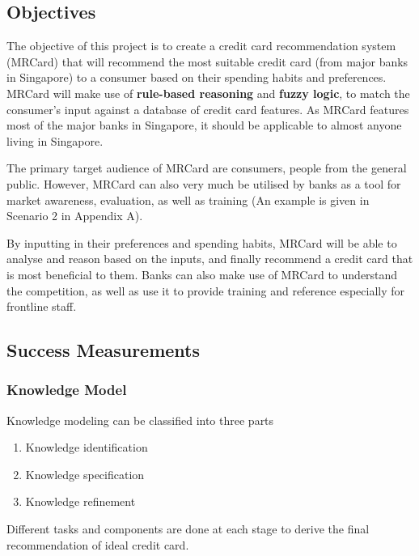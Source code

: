 \subsection{Objectives} %
\label{sub:objectives}
	The objective of this project is to create a credit card recommendation system (MRCard) that will recommend the most suitable credit card (from major banks in Singapore) to a consumer based on their spending habits and preferences. MRCard will make use of \textbf{rule-based reasoning} and \textbf{fuzzy logic}, to match the consumer’s input against a database of credit card features. As MRCard features most of the major banks in Singapore, it should be applicable to almost anyone living in Singapore.

	The primary target audience of MRCard are consumers, people from the general public. However, MRCard can also very much be utilised by banks as a tool for market awareness, evaluation, as well as training (An example is given in Scenario 2 in Appendix A).

	By inputting in their preferences and spending habits, MRCard will be able to analyse and reason based on the inputs, and finally recommend a credit card that is most beneficial to them. Banks can also make use of MRCard to understand the competition, as well as use it to provide training and reference especially for frontline staff.

\subsection{Success Measurements} %
\label{sub:success_measurements}

	\subsubsection{Knowledge Model} %
	\label{ssub:knowledge_model}
		Knowledge modeling can be classified into three parts \cite{schreiber2001knowledge}
		\begin{enumerate}[label=(\roman*)]
			\item Knowledge identification
			\item Knowledge specification
			\item Knowledge refinement
		\end{enumerate}
		Different tasks and components are done at each stage to derive the final recommendation of ideal credit card.

